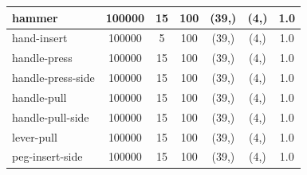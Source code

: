 \documentclass{article}
\theoremstyle{plain}
\theoremstyle{definition}
\theoremstyle{remark}
\begin{document}
\begin{table}[]
{\begin{tabular}{|l|c|c|c|c|c|c|}
hammer                              & 100000                                        & 15                                                   & 100                                             & (39,)                                           & (4,) & 1.0                                            \\ \hline
hand-insert                         & 100000                                        & 5                                                    & 100                                             & (39,)                                           & (4,) & 1.0                                            \\ \hline
handle-press                        & 100000                                        & 15                                                   & 100                                             & (39,)                                           & (4,) & 1.0                                            \\ \hline
handle-press-side                   & 100000                                        & 15                                                   & 100                                             & (39,)                                           & (4,) & 1.0                                            \\ \hline
handle-pull                         & 100000                                        & 15                                                   & 100                                             & (39,)                                           & (4,) & 1.0                                            \\ \hline
handle-pull-side                    & 100000                                        & 15                                                   & 100                                             & (39,)                                           & (4,) & 1.0                                            \\ \hline
lever-pull                          & 100000                                        & 15                                                   & 100                                             & (39,)                                           & (4,) & 1.0                                            \\ \hline
peg-insert-side                     & 100000                                        & 15                                                   & 100                                             & (39,)                                           & (4,) & 1.0                                            \\ \hline

\end{tabular}}
\end{table}
\end{document}
